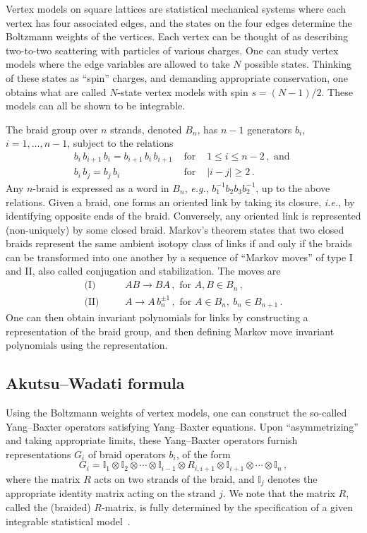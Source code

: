 \documentclass[11pt]{article}
\begin{document}
Vertex models on square lattices are statistical mechanical systems where each vertex has four associated edges, and the states on the four edges determine the Boltzmann weights of the vertices. Each vertex can be thought of as describing two-to-two scattering with particles of various charges. One can study vertex models where the edge variables are allowed to take $N$ possible states. Thinking of these states as ``spin'' charges, and demanding appropriate conservation, one obtains what are called $N$-state vertex models with spin $s=(N-1)/2$. These models can all be shown to be integrable. 

The braid group over $n$ strands, denoted $B_n$, has $n-1$ generators $b_i$, $i=1,\ldots,n-1$, subject to the relations
\begin{eqnarray}
    b_i\, b_{i+1} \, b_i = b_{i+1} \,b_i \, b_{i+1} & \text{ for } & 1\leq i \leq n-2 \,, \text{ and } \nonumber \\
    b_i\, b_j = b_j\, b_i & \text{ for } & |i-j|\geq 2 \,.
\end{eqnarray}
Any $n$-braid is expressed as a word in $B_n$, \textit{e.g.}, $b_1^{-1}b_2b_3b_2^{-1}$, up to the above relations. Given a braid, one forms an oriented link by taking its closure, \textit{i.e.}, by identifying opposite ends of the braid. Conversely, any oriented link is represented (non-uniquely) by some closed braid. Markov's theorem states that two closed braids represent the same ambient isotopy class of links if and only if the braids can be transformed into one another by a sequence of ``Markov moves'' of type I and II, also called conjugation and stabilization. The moves are
\begin{eqnarray}
	\text{(I)} &\quad& AB\to BA \,, \text{ for } A,B\in B_n \,, \\
	\text{(II)} &\quad& A\to A\,b_n^{\pm1}\,, \text{ for } A\in B_n, \ b_n\in B_{n+1} \,.
\end{eqnarray}
One can then obtain invariant polynomials for links by constructing a representation of the braid group, and then defining Markov move invariant polynomials using the representation.

\subsection{Akutsu--Wadati formula}

Using the Boltzmann weights of vertex models, one can construct the so-called Yang--Baxter operators satisfying Yang--Baxter equations. Upon ``asymmetrizing'' and taking appropriate limits, these Yang--Baxter operators furnish representations $G_i$ of braid operators $b_i$, of the form 
\begin{equation}
	G_i = \mathbb{I}_1\otimes\mathbb{I}_2\otimes\cdots\otimes\mathbb{I}_{i-1}\otimes R_{i,i+1}\otimes\mathbb{I}_{i+1}\otimes\cdots\otimes\mathbb{I}_{n}\,,
\end{equation}
where the matrix $R$ acts on two strands of the braid, and $\mathbb{I}_j$ denotes the appropriate identity matrix acting on the strand $j$. We note that the matrix $R$, called the (braided) $R$-matrix, is fully determined by the specification of a given integrable statistical model~\cite{Baxter:1982zz}. 
\end{document}
